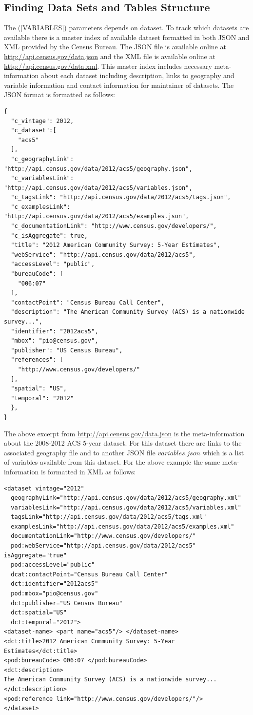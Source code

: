 \documentclass{article}\usepackage[]{graphicx}\usepackage[]{color}
\begin{document}
\subsection{Finding Data Sets and Tables Structure}
\label{sec:var}
The ($[$VARIABLES$]$) parameters depends on dataset.  To track which datasets are available there is a master index of available dataset formatted in both JSON and XML provided by the Census Bureau.  The JSON file is available online at \url{http://api.census.gov/data.json} and the XML file is available online at \url{http://api.census.gov/data.xml}.  This master index includes necessary meta-information about each dataset including description, links to geography and variable information and contact information for maintainer of datasets.  The JSON format is formatted as follows:
\begin{verbatim}
{
  "c_vintage": 2012,
  "c_dataset":[ 
    "acs5"
  ],
  "c_geographyLink": "http://api.census.gov/data/2012/acs5/geography.json",
  "c_variablesLink": "http://api.census.gov/data/2012/acs5/variables.json",
  "c_tagsLink": "http://api.census.gov/data/2012/acs5/tags.json",
  "c_examplesLink": "http://api.census.gov/data/2012/acs5/examples.json",
  "c_documentationLink": "http://www.census.gov/developers/",
  "c_isAggregate": true,
  "title": "2012 American Community Survey: 5-Year Estimates",
  "webService": "http://api.census.gov/data/2012/acs5",
  "accessLevel": "public",
  "bureauCode": [
    "006:07"
  ],
  "contactPoint": "Census Bureau Call Center",
  "description": "The American Community Survey (ACS) is a nationwide survey...",
  "identifier": "2012acs5",
  "mbox": "pio@census.gov",
  "publisher": "US Census Bureau",
  "references": [
    "http://www.census.gov/developers/"
  ],
  "spatial": "US",
  "temporal": "2012"
  },
}
\end{verbatim}
The above excerpt from \url{http://api.census.gov/data.json} is the meta-information about the 2008-2012 ACS 5-year dataset.  For this dataset there are links to the associated geography file and to another JSON file $variables.json$ which is a list of variables available from this dataset.  For the above example the same meta-information is formatted in XML as follows:
\begin{verbatim}
<dataset vintage="2012" 
  geographyLink="http://api.census.gov/data/2012/acs5/geography.xml"
  variablesLink="http://api.census.gov/data/2012/acs5/variables.xml" 
  tagsLink="http://api.census.gov/data/2012/acs5/tags.xml" 
  examplesLink="http://api.census.gov/data/2012/acs5/examples.xml" 
  documentationLink="http://www.census.gov/developers/" 
  pod:webService="http://api.census.gov/data/2012/acs5" isAggregate="true" 
  pod:accessLevel="public" 
  dcat:contactPoint="Census Bureau Call Center" 
  dct:identifier="2012acs5" 
  pod:mbox="pio@census.gov" 
  dct:publisher="US Census Bureau" 
  dct:spatial="US" 
  dct:temporal="2012">
<dataset-name> <part name="acs5"/> </dataset-name>
<dct:title>2012 American Community Survey: 5-Year Estimates</dct:title>
<pod:bureauCode> 006:07 </pod:bureauCode>
<dct:description>
The American Community Survey (ACS) is a nationwide survey...
</dct:description>
<pod:reference link="http://www.census.gov/developers/"/>
</dataset>
\end{verbatim}
\end{document}
